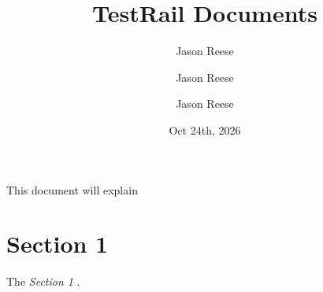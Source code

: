 \documentclass{article}
\begin{document}
\title{TestRail Documents}
\author{Jason Reese}
\author{Jason Reese}
\author{Jason Reese}
\date{Oct 24th, 2026}


\maketitle

\fancyhf{}
\fancyfoot[C]{\thepage}

\maketitle %
\tableofcontents
\newpage %

This document will explain 

\section{Section 1}
The \textit{Section 1} .
\end{document}
